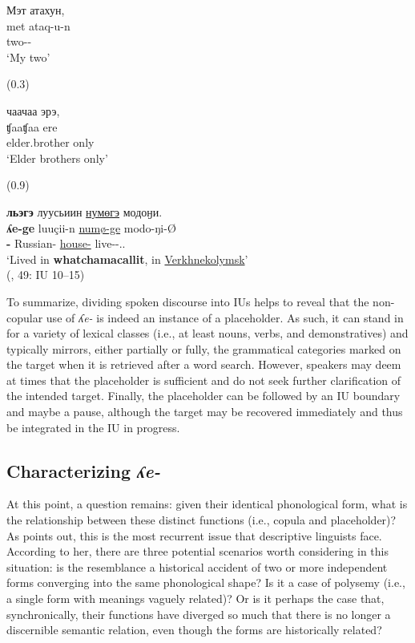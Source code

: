 \documentclass[output=paper,colorlinks,citecolor=brown
\ChapterDOI{10.5281/zenodo.15697581}
]{langscibook}
\begin{document}


\begin{exe}
\ex \label{ex9-same-IU}
    \glll Мэт атахун, \\
    met ataq-u-n \\
    \Fsg{} two-\Ep-\Lnk{} \\
    \glt `My two'

\sn (0.3)

\sn
    \glll чаачаа эрэ, \\
    ʧaaʧaa ere \\
    elder.brother only \\
    \glt `Elder brothers only'

\sn (0.9)

\sn 
    \glll \textbf{льэгэ} луусьиин \uline{нумөгэ} модоӈи.  \\
    \textbf{ʎe-ge} luuçii-n \uline{numø-ge} modo-ŋi-Ø \\
    \textbf{\Ph-\Loc{}} Russian-\Lnk{} \uline{house-\Loc{}} live-\Tpl-\Ass.\Intr.\Ef{} \\
    \glt `Lived in \textbf{whatchamacallit}, in \uline{Verkhnekolymsk}' \\
    \null \hfill (\citealt{Nikolaeva_Mayer2004}, 49: IU 10--15)
\end{exe}

To summarize, dividing spoken discourse into IUs helps to reveal that the non-copular use of \textit{ʎe-} is indeed an instance of a placeholder. 
As such, it can stand in for a variety of lexical classes (i.e., at least nouns, verbs, and demonstratives) and typically mirrors, either partially or fully, the grammatical categories marked on the target when it is retrieved after a word search. 
However, speakers may deem at times that the placeholder is sufficient and do not seek further clarification of the intended target. 
Finally, the placeholder can be followed by an IU boundary and maybe a pause, although the target may be recovered immediately and thus be integrated in the IU in progress.  


\subsection{Characterizing \textit{ʎe-}}

At this point, a question remains: given their identical phonological form, what is the relationship between these distinct functions (i.e., copula and placeholder)? 
As \citet{Epps2008a} points out, this is the most recurrent issue that descriptive linguists face. 
According to her, there are three potential scenarios worth considering in this situation: is the resemblance a historical accident of two or more independent forms converging into the same phonological shape? 
Is it a case of polysemy (i.e., a single form with meanings vaguely related)? 
Or is it perhaps the case that, synchronically, their functions have diverged so much that there is no longer a discernible semantic relation, even though the forms are historically related?
\end{document}
